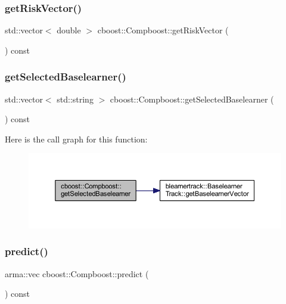 \subsubsection{\texorpdfstring{get\+Risk\+Vector()}{getRiskVector()}}
{\footnotesize\ttfamily std\+::vector$<$ double $>$ cboost\+::\+Compboost\+::get\+Risk\+Vector (\begin{DoxyParamCaption}{ }\end{DoxyParamCaption}) const}

\mbox{\label{classcboost_1_1_compboost_ac66d4490e6539832d4d304a86db746dc}} 
\subsubsection{\texorpdfstring{get\+Selected\+Baselearner()}{getSelectedBaselearner()}}
{\footnotesize\ttfamily std\+::vector$<$ std\+::string $>$ cboost\+::\+Compboost\+::get\+Selected\+Baselearner (\begin{DoxyParamCaption}{ }\end{DoxyParamCaption}) const}

Here is the call graph for this function\+:
\nopagebreak
\begin{figure}[H]
\begin{center}
\leavevmode
\includegraphics[width=350pt]{classcboost_1_1_compboost_ac66d4490e6539832d4d304a86db746dc_cgraph}
\end{center}
\end{figure}
\mbox{\label{classcboost_1_1_compboost_a32d1066a24607ff6ef2f934002adf62b}} 
\subsubsection{\texorpdfstring{predict()}{predict()}\hspace{0.1cm}{\footnotesize\ttfamily [1/2]}}
{\footnotesize\ttfamily arma\+::vec cboost\+::\+Compboost\+::predict (\begin{DoxyParamCaption}{ }\end{DoxyParamCaption}) const}

